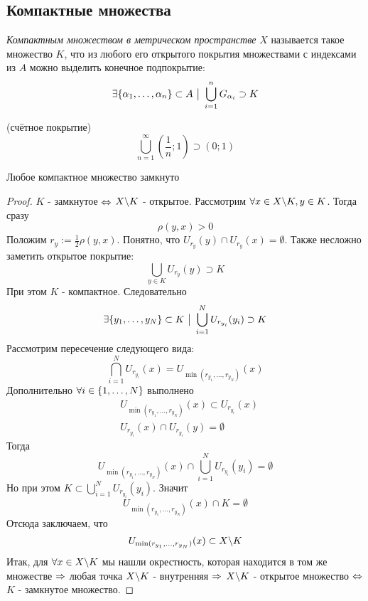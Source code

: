 \subsection{Компактные множества}

\begin{definition}
	\textit{Компактным множеством в метрическом пространстве} $X$ называется такое множество $K$, что из любого его открытого покрытия множествами с индексами из $A$ можно выделить конечное подпокрытие:
	\[
		\exists \{\alpha_1, \ldots, \alpha_n\} \subset A \ \big|\  \bigcup_{i = 1}^n G_{\alpha_i} \supset K
	\]
\end{definition}

\begin{example} (счётное покрытие)
	\[
		\bigcup_{n = 1}^\infty \left(\frac{1}{n}; 1\right) \supset (0; 1)
	\]
\end{example}

\begin{theorem}
	Любое компактное множество замкнуто
\end{theorem}

\begin{proof}
	$K$ - замкнутое $\Leftrightarrow$ $X \backslash K$ - открытое. Рассмотрим $\forall x \in X \backslash K, y \in K$. Тогда сразу
	\[
		\rho(y, x) > 0
	\]
	Положим $r_y := \frac{1}{2}\rho(y, x)$. Понятно, что $U_{r_y}(y) \cap U_{r_y}(x) = \emptyset$. Также несложно заметить открытое покрытие:
	\[
		\bigcup_{y \in K} U_{r_y} (y) \supset K
	\]
	При этом $K$ - компактное. Следовательно
	\[
		\exists \{y_1, \ldots, y_N\} \subset K \ \big|\  \bigcup_{i = 1}^N U_{r_{y_i}}(y_i) \supset K
	\]
	Рассмотрим пересечение следующего вида:
	\[
		\bigcap_{i = 1}^N U_{r_{y_i}}(x) = U_{\min(r_{y_1}, \ldots, r_{y_N})}(x)
	\]
	Дополнительно $\forall i \in \{1, \ldots, N\}$ выполнено
	\begin{align*}
		&{U_{\min(r_{y_1}, \ldots, r_{y_N})}(x) \subset U_{r_{y_i}}(x)}
		\\
		&{U_{r_{y_i}}(x) \cap U_{r_{y_i}}(y) = \emptyset}
	\end{align*}
	Тогда
	\[
		U_{\min(r_{y_1}, \ldots, r_{y_N})}(x) \cap \bigcup_{i = 1}^N U_{r_{y_i}}(y_i) = \emptyset
	\]
	Но при этом $K \subset \bigcup\limits_{i = 1}^N U_{r_{y_i}}(y_i)$. Значит
	\[
		U_{\min(r_{y_1}, \ldots, r_{y_N})}(x) \cap K = \emptyset
	\]
	Отсюда заключаем, что
	\[
		U_{\min(r_{y_1}, \ldots, r_{y_N})}(x) \subset X \backslash K
	\]
	Итак, для $\forall x \in X \backslash K$ мы нашли окрестность, которая находится в том же множестве $\Rightarrow$ любая точка $X \backslash K$ - внутренняя $\Rightarrow$ $X \backslash K$ - открытое множество $\Leftrightarrow$ $K$ - замкнутое множество.
\end{proof}

